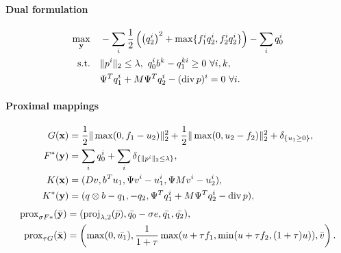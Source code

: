 \paragraph{Dual formulation}
\begin{align*}
    \max_{\mathbf{y}} \quad
        & -\sum_i \frac{1}{2} \left(
                \left(q_2^i\right)^2 + \max\{f_1^i q_2^i,f_2^i q_2^i\}
        \right) - \sum_i q_0^i  \\
    \text{s.t.}\quad
        & \|p^{i}\|_{2} \leq \lambda,
          ~q_0^i b^k - q_1^{ki} \geq 0 ~\forall i, k, \\
        & \Psi^T q_1^i + M \Psi^T q_2^i - (\operatorname{div} p)^i = 0 ~\forall i.
\end{align*}

\paragraph{Proximal mappings}
\begin{align*}
    G(\mathbf{x}) &=
        \frac{1}{2} \|\max(0, f_1 - u_2)\|_2^2
        + \frac{1}{2} \|\max(0, u_2 - f_2)\|_2^2
        + \delta_{\{u_1 \geq 0\}}, \\
    F^*(\mathbf{y}) &=
        \sum_{i} q_0^i
        + \sum_{i} \delta_{\{\|p^{i}\|_{2} \leq \lambda\}}, \\
    K(\mathbf{x}) &= (
        Dv,
        b^T u_1,
        \Psi v^i - u_1^i,
        \Psi M v^i - u_2^i
    ), \\
    K^*(\mathbf{y}) &= (
        q \otimes b - q_1,
        -q_2,
        \Psi^T q_1^i + M \Psi^T q_2^i - \operatorname{div}{p}
    ),
\end{align*}
\begin{align*}
    \operatorname{prox}_{\sigma F*}(\bar{\mathbf{y}})
    &= (
        \operatorname{proj}_{\lambda,2}(\bar{p}),
        \bar{q_0}-\sigma e,
        \bar{q_1},
        \bar{q_2}
   ), \\
    \operatorname{prox}_{\tau G}(\bar{\mathbf{x}})
    &= \left(
        \max(0,\bar{u_1}),
        \frac{1}{1 + \tau}\max(u + \tau f_1, \min(u + \tau f_2, (1 + \tau)u)),
        \bar{v}
    \right).
\end{align*}
